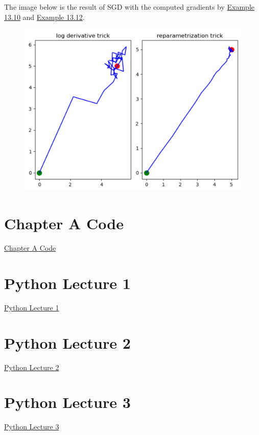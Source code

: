 \documentclass{report}
\begin{document}
\begin{example}
    The image below is the result of SGD with the computed gradients by \hyperref[example:13.10]{Example 13.10} and \hyperref[example:13.12]{Example 13.12}.

    \begin{figure}[H]
        \centering
        \includegraphics[width=1.0\textwidth]{.././assets/13.2.png}
    \end{figure}
\end{example}

\chapter*{Chapter A Code}

\href{https://drive.google.com/file/d/18b01xoORd0LFQmpfc_4ou5Rv44MY1neg/view?usp=sharing}{Chapter A Code}

\chapter*{Python Lecture 1}

\href{https://drive.google.com/file/d/1-iY9XfDhWNRDq3z_wVVvOzU04aRQWAfW/view?usp=drive_link}{Python Lecture 1}

\chapter*{Python Lecture 2}

\href{https://drive.google.com/file/d/1BANbCC6jBjPEUFSRJMFkcLbc4oVmoQHm/view?usp=sharing}{Python Lecture 2}

\chapter*{Python Lecture 3}

\href{https://drive.google.com/file/d/1-Bc11RZmno6yx37kfVLjsyY-XKpLK5Je/view?usp=drive_link}{Python Lecture 3}
\end{document}
